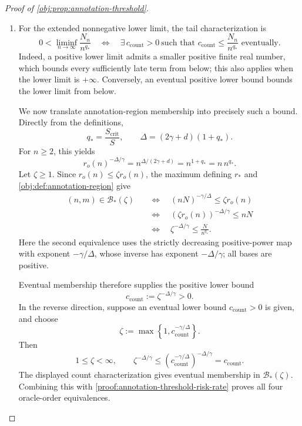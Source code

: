 \documentclass[11pt]{article}
\begin{document}
\begin{proof}[Proof of \cref{obj:prop:annotation-threshold}]
\begin{enumerate}
\item
For the extended nonnegative lower limit, the tail characterization is
\[
0<\liminf_{n\to\infty}\frac{N_n}{n^{q_*}}
\quad\Longleftrightarrow\quad
\exists\,c_{\mathrm{count}}>0\
\text{such that }
c_{\mathrm{count}}\le\frac{N_n}{n^{q_*}}
\text{ eventually}.
\]
Indeed, a positive lower limit admits a smaller positive finite real number, which bounds every sufficiently late term from below; this also applies when the lower limit is \(+\infty\). Conversely, an eventual positive lower bound bounds the lower limit from below.

We now translate annotation-region membership into precisely such a bound. Directly from the definitions,
\[
q_*=\frac{S_{\mathrm{crit}}}{S},
\qquad
\Delta=(2\gamma+d)(1+q_*).
\]
For \(n\ge2\), this yields
\[
r_o(n)^{-\Delta/\gamma}
=n^{\Delta/(2\gamma+d)}
=n^{1+q_*}
=n\,n^{q_*}.
\]
Let \(\zeta\ge1\). Since \(r_o(n)\le\zeta r_o(n)\), the maximum defining \(r_*\) and
\cref{obj:def:annotation-region} give
\[
\begin{aligned}
(n,m)\in\mathcal B_*(\zeta)
&\quad\Longleftrightarrow\quad
(nN)^{-\gamma/\Delta}\le\zeta r_o(n)\\
&\quad\Longleftrightarrow\quad
(\zeta r_o(n))^{-\Delta/\gamma}\le nN\\
&\quad\Longleftrightarrow\quad
\zeta^{-\Delta/\gamma}\le\frac{N}{n^{q_*}}.
\end{aligned}
\]
Here the second equivalence uses the strictly decreasing positive-power map with exponent \(-\gamma/\Delta\), whose inverse has exponent \(-\Delta/\gamma\); all bases are positive.

Eventual membership therefore supplies the positive lower bound
\[
c_{\mathrm{count}}:=\zeta^{-\Delta/\gamma}>0.
\]
In the reverse direction, suppose an eventual lower bound \(c_{\mathrm{count}}>0\) is given, and choose
\[
\zeta:=\max\left\{1,c_{\mathrm{count}}^{-\gamma/\Delta}\right\}.
\]
Then
\[
1\le\zeta<\infty,
\qquad
\zeta^{-\Delta/\gamma}
\le
\left(c_{\mathrm{count}}^{-\gamma/\Delta}\right)^{-\Delta/\gamma}
=c_{\mathrm{count}}.
\]
The displayed count characterization gives eventual membership in
\(\mathcal B_*(\zeta)\). Combining this with \cref{proof:annotation-threshold-risk-rate} proves all four oracle-order equivalences.


\end{enumerate}
\end{proof}
\end{document}
